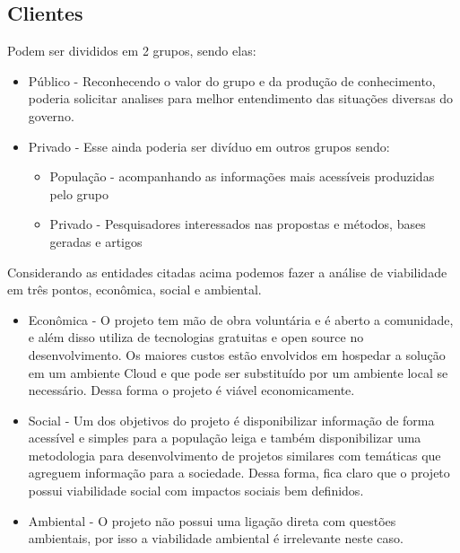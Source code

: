 \documentclass[journal]{IEEEtran}
\begin{document}
\subsection{Clientes}
Podem ser divididos em 2 grupos, sendo elas:
\begin{itemize}
    \item Público - Reconhecendo o valor do grupo e da produção de conhecimento, poderia solicitar analises para melhor entendimento das situações diversas do governo.
    \item Privado - Esse ainda poderia ser divíduo em outros grupos sendo:
    \begin{itemize}
    \item População - acompanhando as informações mais acessíveis produzidas pelo grupo
    \item Privado - Pesquisadores interessados nas propostas e métodos, bases geradas e artigos
    \end{itemize}
\end{itemize}
 
Considerando as entidades citadas acima podemos fazer a análise de viabilidade em três pontos, econômica, social e ambiental.
\begin{itemize}
    \item Econômica - O projeto tem mão de obra voluntária e é aberto a comunidade, e além disso utiliza de tecnologias gratuitas e open source no desenvolvimento. Os maiores custos estão envolvidos em hospedar a solução em um ambiente Cloud e que pode ser substituído por um ambiente local se necessário. Dessa forma o projeto é viável economicamente.
    \item Social - Um dos objetivos do projeto é disponibilizar informação de forma acessível e simples para a população leiga e também disponibilizar uma metodologia para desenvolvimento de projetos similares com temáticas que agreguem informação para a sociedade. Dessa forma, fica claro que o projeto possui viabilidade social com impactos sociais bem definidos. 
    \item Ambiental - O projeto não possui uma ligação direta com questões ambientais, por isso a viabilidade ambiental é irrelevante neste caso.
\end{itemize}


\end{document}
